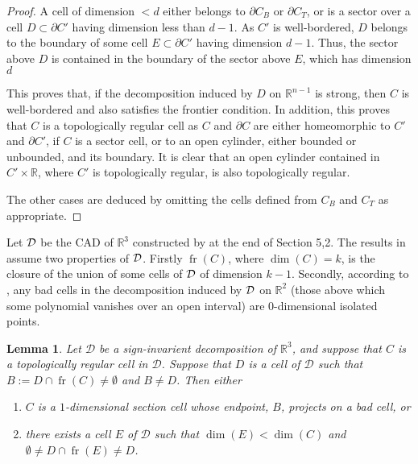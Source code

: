 \documentclass[
]{book}
\providecommand{\tightlist}{%
  \setlength{\itemsep}{0pt}\setlength{\parskip}{0pt}}
\newtheorem{lemma}{Lemma}[chapter]
\theoremstyle{definition}
\theoremstyle{definition}
\theoremstyle{definition}
\theoremstyle{definition}
\theoremstyle{remark}
\begin{document}
\begin{proof}
A cell of dimension \(< d\) either belongs to \(\partial C_B\) or \(\partial C_T\), or is a sector over a cell \(D \subset \partial C'\) having dimension less than \(d-1\).
As \(C'\) is well-bordered, \(D\) belongs to the boundary of some cell \(E \subset \partial C'\) having dimension \(d-1\).
Thus, the sector above \(D\) is contained in the boundary of the sector above \(E\), which has dimension \(d\)

This proves that, if the decomposition induced by \(D\) on \(\mathbb{R}^{n-1}\) is strong, then \(C\) is well-bordered and also satisfies the frontier condition. In addition, this proves that \(C\) is a topologically regular cell as \(C\) and \(\partial C\) are either homeomorphic to \(C'\) and \(\partial C'\), if \(C\) is a sector cell, or to an open cylinder, either bounded or unbounded, and its boundary. It is clear that an open cylinder contained in \(C' \times \mathbb{R}\), where \(C'\) is topologically regular, is also topologically regular.

The other cases are deduced by omitting the cells defined from \(C_B\) and \(C_T\) as appropriate.
\end{proof}

Let \(\cal D\) be the CAD of \(\mathbb{R}^3\) constructed by \citet{lazard10} at the end of Section 5,2. The results in \citep[Section 5.3]{lazard10} assume two properties of \(\cal D\). Firstly \({\operatorname{fr} \left(  C  \right)}\), where \(\dim(C) = k\), is the closure of the union of some cells of \(\cal D\) of dimension \(k-1\). Secondly, according to \citep[Proposition 5.13]{lazard10}, any bad cells in the decomposition induced by \(\cal D\) on \(\mathbb{R}^2\) (those above which some polynomial vanishes over an open interval) are 0-dimensional isolated points.

\begin{lemma}

\citep[ Proposition 5.13]{lazard10}
Let \(\mathcal{D}\) be a sign-invarient decomposition of \(\mathbb{R}^3\), and suppose that \(C\) is a topologically regular cell in \(\mathcal{D}\).
Suppose that \(D\) is a cell of \(\mathcal{D}\) such that \(B := D \cap {\operatorname{fr} \left(  C  \right)} \neq \emptyset\) and \(B \neq D\). Then either

\begin{enumerate}
\def\labelenumi{\arabic{enumi}.}
\tightlist
\item
  \(C\) is a \(1\)-dimensional section cell whose endpoint, \(B\), projects on a bad cell, or
\item
  there exists a cell \(E\) of \(\mathcal{D}\) such that \(\dim(E) < \dim(C)\) and \(\emptyset \neq D \cap {\operatorname{fr} \left(  E  \right)} \neq D\).
\end{enumerate}

\end{lemma}
\end{document}
